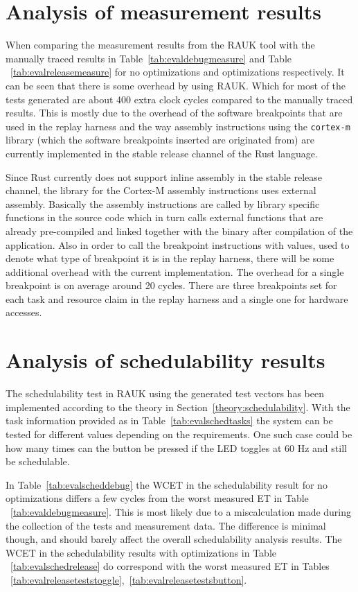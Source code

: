 \section{Analysis of measurement results}
\label{discussion:measurement}
When comparing the measurement results from the RAUK tool with the manually
traced results in Table~\ref{tab:evaldebugmeasure} and Table
~\ref{tab:evalreleasemeasure} for no optimizations and optimizations
respectively. It can be seen that there is some overhead by using RAUK\@. Which
for most of the tests generated are about 400 extra clock cycles compared to
the manually traced results. This is mostly due to the overhead of the software
breakpoints that are used in the replay harness and the way assembly
instructions using the \texttt{cortex-m} library (which the software
breakpoints inserted are originated from) are currently implemented in the
stable release channel of the Rust language.

Since Rust currently does not support inline assembly in the stable release
channel, the library for the Cortex-M assembly instructions uses external
assembly. Basically the assembly instructions are called by library specific
functions in the source code which in turn calls external functions that are
already pre-compiled and linked together with the binary after compilation of
the application. Also in order to call the breakpoint instructions with values,
used to denote what type of breakpoint it is in the replay harness, there will
be some additional overhead with the current implementation. The overhead for a
single breakpoint is on average around 20 cycles. There are three breakpoints
set for each task and resource claim in the replay harness and a single one for
hardware accesses.

\section{Analysis of schedulability results}
The schedulability test in RAUK using the generated test vectors has been
implemented according to the theory in Section~\ref{theory:schedulability}.
With the task information provided as in Table~\ref{tab:evalschedtasks} the
system can be tested for different values depending on the requirements. One
such case could be how many times can the button be pressed if the LED toggles
at 60 Hz and still be schedulable.

In Table~\ref{tab:evalscheddebug} the WCET in the schedulability result for no
optimizations differs a few cycles from the worst measured ET in Table
~\ref{tab:evaldebugmeasure}. This is most likely due to a miscalculation made
during the collection of the tests and measurement data. The difference is
minimal though, and should barely affect the overall schedulability analysis
results. The WCET in the schedulability results with optimizations in Table
~\ref{tab:evalschedrelease} do correspond with the worst measured ET in Tables
~\ref{tab:evalreleaseteststoggle},~\ref{tab:evalreleasetestsbutton}.

